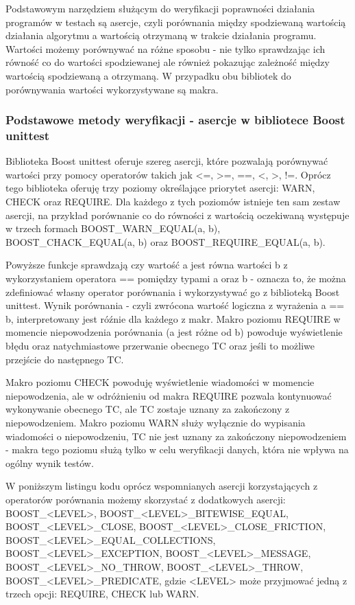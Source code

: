 \documentclass[12pt,a4paper,notitlepage]{report}
\begin{document}
Podstawowym narzędziem służącym do weryfikacji poprawności działania programów w testach są asercje, czyli porównania między spodziewaną wartością działania algorytmu a wartością otrzymaną w trakcie działania programu.
Wartości możemy porównywać na różne sposobu - nie tylko sprawdzając ich równość co do wartości spodziewanej ale również pokazując zależność między wartością spodziewaną a otrzymaną. W przypadku obu bibliotek do porównywania wartości wykorzystywane są makra.

\subsubsection{Podstawowe metody weryfikacji - asercje w bibliotece Boost unittest}

Biblioteka Boost unittest oferuje szereg asercji, które pozwalają porównywać wartości przy pomocy operatorów takich jak <=, >=, ==, <, >, !=. Oprócz tego biblioteka oferuję trzy poziomy określające priorytet asercji: WARN, CHECK oraz REQUIRE. Dla każdego z tych poziomów istnieje ten sam zestaw asercji, na przykład porównanie co do równości z wartością oczekiwaną występuje w trzech formach BOOST{\_}WARN{\_}EQUAL(a, b), BOOST{\_}CHACK{\_}EQUAL(a, b) oraz BOOST{\_}REQUIRE{\_}EQUAL(a, b).

Powyższe funkcje sprawdzają czy wartość a jest równa wartości b z wykorzystaniem operatora == pomiędzy typami a oraz b - oznacza to, że można zdefiniować własny operator porównania i wykorzystywać go z biblioteką Boost unittest. 
Wynik porównania - czyli zwrócona wartość logiczna z wyrażenia a == b, interpretowany jest róźnie dla każdego z makr. Makro poziomu REQUIRE w momencie niepowodzenia porównania (a jest różne od b) powoduje wyświetlenie błędu oraz natychmiastowe przerwanie obecnego TC oraz jeśli to możliwe przejście do następnego TC.

Makro poziomu CHECK powoduję wyświetlenie wiadomości w momencie niepowodzenia, ale w odróżnieniu od makra REQUIRE pozwala kontynuować wykonywanie obecnego TC, ale TC zostaje uznany za zakończony z niepowodzeniem.
Makro poziomu WARN służy wyłącznie do wypisania wiadomości o niepowodzeniu, TC nie jest uznany za zakończony niepowodzeniem - makra tego poziomu służą tylko w celu weryfikacji danych, która nie wpływa na ogólny wynik testów.

W poniższym listingu kodu oprócz wspomnianych asercji korzystających z operatorów porównania możemy skorzystać z dodatkowych asercji: BOOST{\_}<LEVEL>, BOOST{\_}<LEVEL>{\_}BITEWISE{\_}EQUAL, BOOST{\_}<LEVEL>{\_}CLOSE, BOOST{\_}<LEVEL>{\_}CLOSE{\_}FRICTION, BOOST{\_}<LEVEL>{\_}EQUAL{\_}COLLECTIONS, BOOST{\_}<LEVEL>{\_}EXCEPTION, BOOST{\_}<LEVEL>{\_}MESSAGE, BOOST{\_}<LEVEL>{\_}NO{\_}THROW, BOOST{\_}<LEVEL>{\_}THROW, BOOST{\_}<LEVEL>{\_}PREDICATE, gdzie <LEVEL> może przyjmować jedną z trzech opcji: REQUIRE, CHECK lub WARN.
\end{document}
